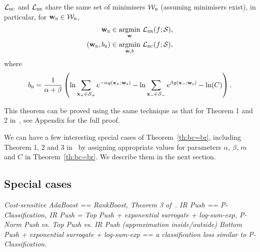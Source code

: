 \begin{theorem}
\label{th:bc=br}
$\mathcal{L}_\textsc{bc}$ and $\mathcal{L}_\textsc{br}$ share the same set of minimisers $\mathcal{W}_\textsc{b}$
(assuming minimisers exist), in particular, for $\mathbf{w}_\textsc{b} \in \mathcal{W}_\textsc{b}$,
\begin{equation*}
\begin{aligned}
                \mathbf{w}_\textsc{b} & \in \operatorname*{argmin}_{\mathbf{w}}     \, \mathcal{L}_\textsc{br}(f; \mathcal{S}), \\
(\mathbf{w}_\textsc{b}, b_\textsc{b}) & \in \operatorname*{argmin}_{\mathbf{w},b} \, \mathcal{L}_\textsc{bc}(f; \mathcal{S}),
\end{aligned}
\end{equation*}
where
$$
\displaystyle
b_\textsc{b} 
= \frac{1}{\alpha + \beta} \left( 
  \ln \sum_{\mathbf{x}_+ \in \mathcal{S}_+} e^{-\alpha g(\mathbf{x}_+; \mathbf{w}_\textsc{b})} -
  \ln \sum_{\mathbf{x}_- \in \mathcal{S}_-} e^{  \beta g(\mathbf{x}_-; \mathbf{w}_\textsc{b})} - \ln(C) \right).
$$
\end{theorem}

This theorem can be proved using the same technique as that for Theorem 1 and 2 in~\cite{ertekin2011equivalence},
see Appendix for the full proof.

We can have a few interesting special cases of Theorem~\ref{th:bc=br},
including Theorem 1, 2 and 3 in~\cite{ertekin2011equivalence} by 
assigning appropriate values for parameters $\alpha$, $\beta$, $m$ and $C$ in Theorem~\ref{th:bc=br}.
We describe them in the next section.




\subsection{Special cases}

\TODO

{\it Cost-sensitive AdaBoost == RankBoost, Theorem 3 of~\cite{ertekin2011equivalence}.
IR Push == P-Classification,
IR Push = Top Push + exponential surrogate + log-sum-exp, P-Norm Push vs. Top Push vs. IR Push (approximation inside/outside)
Bottom Push + exponential surrogate + log-sum-exp == a classification loss similar to P-Classification.
}

